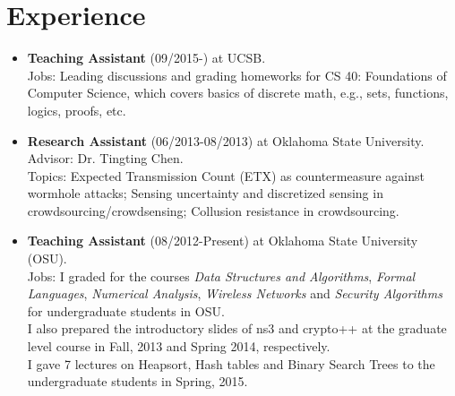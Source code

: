 \documentclass{article}
\begin{document}
\section{{Experience}}
\begin{itemize}
\item {\bf Teaching Assistant} (09/2015-) at UCSB.\\
Jobs: Leading discussions and grading homeworks for CS 40: Foundations of Computer Science, which covers basics of discrete math, e.g., sets, functions, logics, proofs, etc.
\item {\bf Research Assistant} (06/2013-08/2013) at Oklahoma State University.\\
Advisor: Dr. Tingting Chen.\\
Topics: Expected Transmission Count (ETX) as countermeasure against wormhole attacks; Sensing uncertainty and discretized sensing in crowdsourcing/crowdsensing; Collusion resistance in crowdsourcing.
%
%
\item {\bf Teaching Assistant} (08/2012-Present) at Oklahoma State University (OSU).\\
Jobs: I graded for the courses {\it Data Structures and Algorithms}, {\it Formal Languages}, {\it Numerical Analysis}, {\it Wireless Networks} and {\it Security Algorithms} for undergraduate students in OSU. \\
I also prepared the introductory slides of ns3 and crypto++ at the graduate level course in Fall, 2013 and Spring 2014, respectively.\\
I gave 7 lectures on Heapsort, Hash tables and Binary Search Trees to the undergraduate students in Spring, 2015.


\end{itemize}
\end{document}

